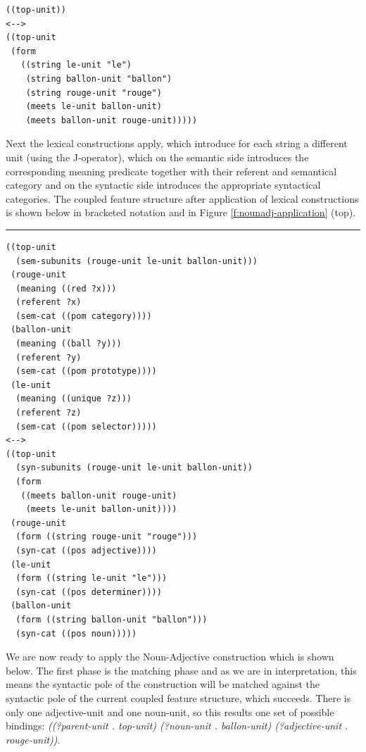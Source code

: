 \footnotesize
\begin{Verbatim}[frame=lines, label=Initial Structure]
((top-unit))
<-->
((top-unit
 (form
   ((string le-unit "le")
    (string ballon-unit "ballon")
    (string rouge-unit "rouge")
    (meets le-unit ballon-unit)
    (meets ballon-unit rouge-unit)))))
\end{Verbatim}
\normalsize

Next the lexical constructions apply, which introduce for each string
a different unit (using the J-operator), which on the semantic side
introduces the corresponding meaning predicate together with their
referent and semantical category and on the syntactic side introduces
the appropriate syntactical categories. The coupled feature structure
after application of lexical constructions is shown below in bracketed
notation and in Figure \ref{f:nounadj-application} (top).

\footnotesize
\noindent\rule{\textwidth}{.5pt} %
\begin{Verbatim}[frame=lines, label=Structure before application of the Noun-Adjective construction] 
((top-unit
  (sem-subunits (rouge-unit le-unit ballon-unit)))
 (rouge-unit
  (meaning ((red ?x)))
  (referent ?x)
  (sem-cat ((pom category))))
 (ballon-unit
  (meaning ((ball ?y)))
  (referent ?y)
  (sem-cat ((pom prototype))))
 (le-unit
  (meaning ((unique ?z)))
  (referent ?z)
  (sem-cat ((pom selector)))))
<-->
((top-unit
  (syn-subunits (rouge-unit le-unit ballon-unit))
  (form
   ((meets ballon-unit rouge-unit) 
    (meets le-unit ballon-unit))))
 (rouge-unit
  (form ((string rouge-unit "rouge")))
  (syn-cat ((pos adjective))))
 (le-unit 
  (form ((string le-unit "le"))) 
  (syn-cat ((pos determiner))))
 (ballon-unit
  (form ((string ballon-unit "ballon")))
  (syn-cat ((pos noun)))))
\end{Verbatim}
\normalsize

We are now ready to apply the Noun-Adjective construction which is
shown below. The first phase is the matching phase and as we are in
interpretation, this means the syntactic pole of the construction will
be matched against the syntactic pole of the current coupled feature
structure, which succeeds. There is only one adjective-unit and one
noun-unit, so this results one set of possible bindings:
\emph{((?parent-unit . top-unit) (?noun-unit . ballon-unit)
  (?adjective-unit . rouge-unit))}.

